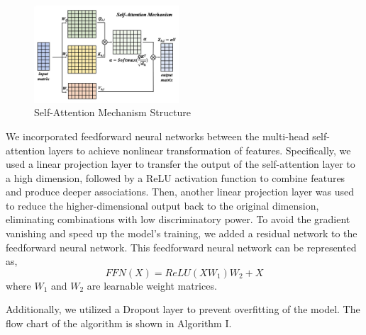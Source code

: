 \documentclass[journal,twoside,web]{ieeecolor}
\begin{document}
\begin{figure}[htb]
	\centering
	\includegraphics[width=0.48\textwidth]{imgs/attention.jpg}
	\caption{Self-Attention Mechanism Structure}
	\label{fig2}
\end{figure} 

We incorporated feedforward neural networks between the multi-head self-attention layers to achieve nonlinear transformation of features. Specifically, we used a linear projection layer to transfer the output of the self-attention layer to a high dimension, followed by a ReLU activation function to combine features and produce deeper associations. Then, another linear projection layer was used to reduce the higher-dimensional output back to the original dimension, eliminating combinations with low discriminatory power. To avoid the gradient vanishing and speed up the model's training, we added a residual network to the feedforward neural network. This feedforward neural network can be represented as,
\begin{equation}
	FFN(X) = ReLU(XW_1)W_2 + X
\end{equation}
where $W_1$ and $W_2$ are learnable weight matrices.

Additionally, we utilized a Dropout layer to prevent overfitting of the model. The flow chart of the algorithm is shown in Algorithm I.
\end{document}

